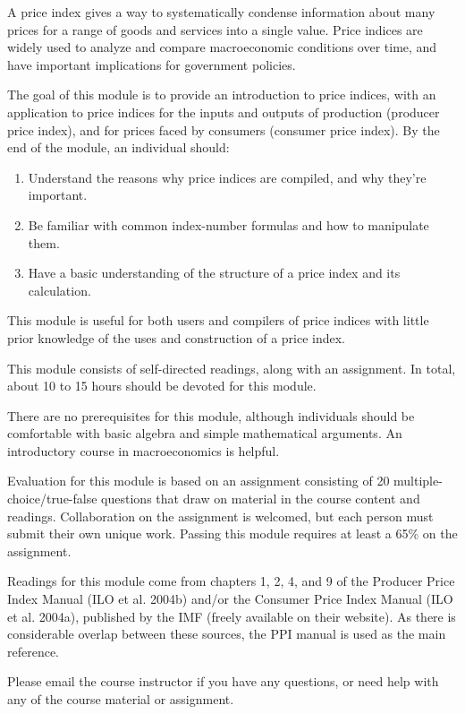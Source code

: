 \documentclass[]{article}
\begin{document}
A price index gives a way to systematically condense information about many prices for a range of goods and services into a single value. Price indices are widely used to analyze and compare macroeconomic conditions over time, and have important implications for government policies.

The goal of this module is to provide an introduction to price indices, with an application to price indices for the inputs and outputs of production (producer price index), and for prices faced by consumers (consumer price index). By the end of the module, an individual should:

\begin{enumerate}
\def\labelenumi{\arabic{enumi}.}
\item
  Understand the reasons why price indices are compiled, and why they're important.
\item
  Be familiar with common index-number formulas and how to manipulate them.
\item
  Have a basic understanding of the structure of a price index and its calculation.
\end{enumerate}

This module is useful for both users and compilers of price indices with little prior knowledge of the uses and construction of a price index.

This module consists of self-directed readings, along with an assignment. In total, about 10 to 15 hours should be devoted for this module.

There are no prerequisites for this module, although individuals should be comfortable with basic algebra and simple mathematical arguments. An introductory course in macroeconomics is helpful.

Evaluation for this module is based on an assignment consisting of 20 multiple-choice/true-false questions that draw on material in the course content and readings. Collaboration on the assignment is welcomed, but each person must submit their own unique work. Passing this module requires at least a 65\% on the assignment.

Readings for this module come from chapters 1, 2, 4, and 9 of the Producer Price Index Manual (ILO et al. 2004b) and/or the Consumer Price Index Manual (ILO et al. 2004a), published by the IMF (freely available on their website). As there is considerable overlap between these sources, the PPI manual is used as the main reference.

Please email the course instructor if you have any questions, or need help with any of the course material or assignment.
\end{document}
